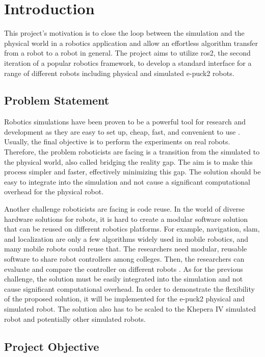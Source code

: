 \chapter{Introduction}
\label{chap:introduction}

This project's motivation is to close the loop between the simulation and the physical world in a robotics application and allow an effortless algorithm transfer from a robot to a robot in general.
The project aims to utilize \ac{ros2}, the second iteration of a popular robotics framework, to develop a standard interface for a range of different robots including physical and simulated e-puck2 robots.

\section{Problem Statement}
Robotics simulations have been proven to be a powerful tool for research and development as they are easy to set up, cheap, fast, and convenient to use \cite{michel_cyberbotics_2004}.
Usually, the final objective is to perform the experiments on real robots.
Therefore, the problem roboticists are facing is a transition from the simulated to the physical world, also called bridging the reality gap.
The aim is to make this process simpler and faster, effectively minimizing this gap. 
The solution should be easy to integrate into the simulation and not cause a significant computational overhead for the physical robot.

Another challenge roboticists are facing is code reuse. 
In the world of diverse hardware solutions for robots, it is hard to create a modular software solution that can be reused on different robotics platforms.
For example, navigation, \ac{slam}, and localization are only a few algorithms widely used in mobile robotics, and many mobile robots could reuse that.
The researchers need modular, reusable software to share robot controllers among colleges.
Then, the researchers can evaluate and compare the controller on different robots \cite{vaughan_really_2007}.
As for the previous challenge, the solution must be easily integrated into the simulation and not cause significant computational overhead.
In order to demonstrate the flexibility of the proposed solution, it will be implemented for the e-puck2 physical and simulated robot.
The solution also has to be scaled to the Khepera IV simulated robot and potentially other simulated robots.

\section{Project Objective}

